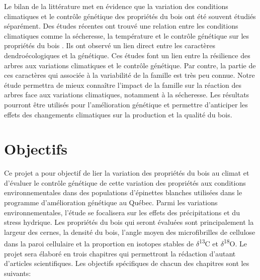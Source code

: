 \documentclass{report}
\newcommand{\Ctreize}{$\delta$\textsuperscript{13}C\xspace}
\newcommand{\Odixhuit}{$\delta$\textsuperscript{18}O\xspace}
\begin{document}
Le bilan de la littérature met en évidence que la variation des conditions climatiques et le contrôle génétique des propriétés du bois ont été souvent étudiés séparément. Des études récentes ont trouvé une relation entre les conditions climatiques comme la sécheresse, la température et le contrôle génétique sur les propriétés du bois \citep{Housset2018, Heer2018}. Ils ont observé un lien direct entre les caractères dendroécologiques et la génétique. Ces études font un lien entre la résilience des arbres aux variations climatiques et le contrôle génétique. Par contre, la partie de ces caractères qui associée à la variabilité de la famille est très peu connue. Notre étude permettra de mieux connaître l'impact de la famille sur la réaction des arbres face aux variations climatiques, notamment à la sécheresse. Les résultats pourront être utilisés pour l'amélioration génétique et permettre d'anticiper les effets des changements climatiques sur la production et la qualité du bois. \\


\section{Objectifs}

Ce projet a pour objectif de lier la variation des propriétés du bois au climat et d'évaluer le contrôle génétique de cette variation des propriétés aux conditions environnementales dans des populations d'épinettes blanches utilisées dans le programme d'amélioration génétique au Québec. Parmi les variations environnementales, l'étude se focalisera sur les effets des précipitations et du stress hydrique. Les propriétés du bois qui seront évaluées sont principalement la largeur des cernes, la densité du bois, l'angle moyen des microfibrilles de cellulose dans la paroi cellulaire et la proportion en isotopes stables de \Ctreize et \Odixhuit. Le projet sera élaboré en trois chapitres qui permettront la rédaction d'autant d'articles scientifiques. Les objectifs spécifiques de chacun des chapitres sont les suivants:\\
\end{document}
